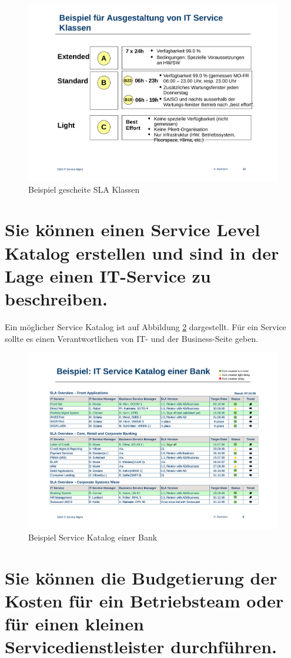 \begin{figure}[h!]
\centering
\includegraphics[width=0.7\linewidth]{fig/beispiel-schlaue-sla-klassen}
\caption{Beispiel gescheite SLA Klassen}
\label{fig:beispiel-schlaue-sla-klassen}
\end{figure}

\newpage

\section{Sie können einen Service Level Katalog erstellen und sind in der Lage einen IT-Service zu beschreiben.}

Ein möglicher Service Katalog ist auf Abbildung \ref{fig:beispiel-service-katalog} dargestellt. Für ein Service sollte es einen Verantwortlichen von IT- und der Business-Seite geben.

\begin{figure}[h!]
\centering
\includegraphics[width=0.7\linewidth]{fig/beispiel-service-katalog}
\caption{Beispiel Service Katalog einer Bank}
\label{fig:beispiel-service-katalog}
\end{figure}

\section{Sie können die Budgetierung der Kosten für ein Betriebsteam oder für einen kleinen Servicedienstleister durchführen.}

